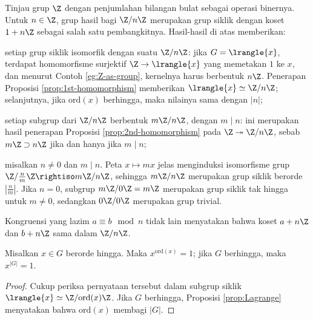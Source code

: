 \begin{example}\label{eg:cyclic-group}
	Tinjau grup $\Z$ dengan penjumlahan bilangan bulat sebagai operasi binernya. Untuk $n \in \Z$, grup hasil bagi $\Z/n\Z$ merupakan grup siklik dengan koset $1 + n\Z$ sebagai salah satu pembangkitnya. Hasil-hasil di atas memberikan:
	\begin{compactenum}[(i)]
		\item setiap grup siklik isomorfik dengan suatu $\Z/n\Z$: jika $G=\lrangle{x}$, terdapat homomorfisme surjektif $\Z \to \lrangle{x}$ yang memetakan $1$ ke $x$, dan menurut Contoh \ref{eg:Z-as-group}, kernelnya harus berbentuk $n\Z$. Penerapan Proposisi \ref{prop:1st-homomorphism} memberikan $\lrangle{x} \simeq \Z/n\Z$; selanjutnya, jika $\text{ord}(x)$ berhingga, maka nilainya sama dengan $|n|$;
		\item setiap subgrup dari $\Z/n\Z$ berbentuk $m\Z/n\Z$, dengan $m \mid n$: ini merupakan hasil penerapan Proposisi \ref{prop:2nd-homomorphism} pada $\Z \twoheadrightarrow \Z/n\Z$, sebab $m\Z \supset n\Z$ jika dan hanya jika $m \mid n$;
		\item misalkan $n \ne 0$ dan $m \mid n$. Peta $x \mapsto mx$ jelas menginduksi isomorfisme grup $\Z/\frac{n}{m}\Z \rightiso m\Z/n\Z$, sehingga $m\Z/n\Z$ merupakan grup siklik berorde $\left|\frac{n}{m}\right|$. Jika $n=0$, subgrup $m\Z/0\Z=m\Z$ merupakan grup siklik tak hingga untuk $m\ne0$, sedangkan $0\Z/0\Z$ merupakan grup trivial.
	\end{compactenum}
	Kongruensi yang lazim $a \equiv b \mod n$ tidak lain menyatakan bahwa koset $a+n\Z$ dan $b+n\Z$ sama dalam $\Z/n\Z$.
\end{example}

\begin{proposition}\label{prop:ord-power}
	Misalkan $x \in G$ berorde hingga. Maka $x^{\text{ord}(x)}=1$; jika $G$ berhingga, maka $x^{|G|}=1$.
\end{proposition}
\begin{proof}
	Cukup periksa pernyataan tersebut dalam subgrup siklik $\lrangle{x} \simeq \Z/\text{ord}(x)\Z$. Jika $G$ berhingga, Proposisi \ref{prop:Lagrange} menyatakan bahwa $\text{ord}(x)$ membagi $|G|$.
\end{proof}

